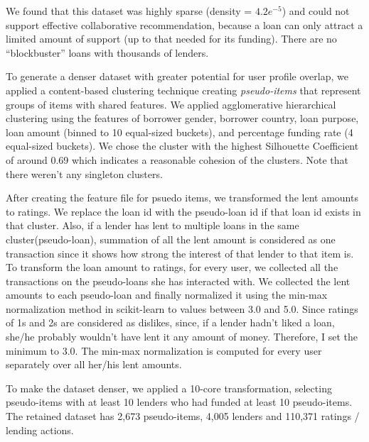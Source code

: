     
    We found that this dataset was highly sparse (density = $4.2e^{-5}$) and could not support effective collaborative recommendation, because a loan can only attract a limited amount of support (up to that needed for its funding). There are no ``blockbuster'' loans with thousands of lenders.
    
    To generate a denser dataset with greater potential for user profile overlap, we applied a content-based clustering technique creating \textit{pseudo-items} that represent groups of items with shared features. We applied agglomerative hierarchical clustering \cite{rokach2005clustering} using the features of borrower gender, borrower country, loan purpose, loan amount (binned to 10 equal-sized buckets), and percentage funding rate (4 equal-sized buckets). We chose the cluster with the highest Silhouette Coefficient \cite{rousseeuw1987silhouettes} of around 0.69 which indicates a reasonable cohesion of the clusters. Note that there weren't any singleton clusters.
    
    After creating the feature file for psuedo items, we transformed the lent amounts to ratings. We replace the loan id with the pseudo-loan id if that loan id exists in that cluster. Also, if a lender has lent to multiple loans in the same cluster(pseudo-loan), summation of all the lent amount is considered as one transaction since it shows how strong the interest of that lender to that item is.
    To transform the loan amount to ratings, for every user, we collected all the transactions on the pseudo-loans she has interacted with. We collected the lent amounts to each pseudo-loan and finally normalized it using the min-max normalization method in scikit-learn \cite{scikit-learn} to values between 3.0 and 5.0. Since ratings of 1s and 2s are considered as dislikes, since, if a lender hadn't liked a loan, she/he probably wouldn't have lent it any amount of money. Therefore, I set the minimum to 3.0. The min-max normalization is computed for every user separately over all her/his lent amounts.

    To make the dataset denser, we applied a 10-core transformation, selecting pseudo-items with at least 10 lenders who had funded at least 10 pseudo-items. The retained dataset has 2,673 pseudo-items, 4,005 lenders and 110,371 ratings / lending actions.
    

